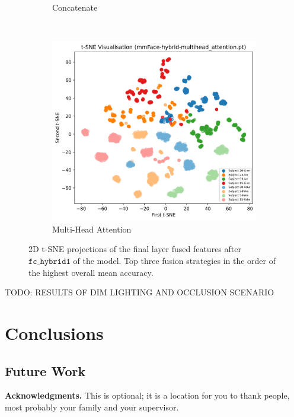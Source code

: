 \documentclass{mpaper}
\begin{document}
\begin{figure}[!htb]
\begin{subfigure}[b]{0.3\textwidth}
        \caption{Concatenate}
        \label{fig:tsne_concatenate}
    \end{subfigure}
    ~
    \begin{subfigure}[b]{0.3\textwidth}
        \includegraphics[width=\textwidth]{figures/tsne_multihead_attention.png}
        \caption{Multi-Head Attention}
        \label{fig:tsne_multihead_attention}
    \end{subfigure}
    \vspace{0.3cm}
    \caption{2D t-SNE projections of the final layer fused features after $\mathtt{fc\_hybrid1}$ of the model. Top three fusion strategies in the order of the highest overall mean accuracy.}
\end{figure}

TODO: RESULTS OF DIM LIGHTING AND OCCLUSION SCENARIO



\section{Conclusions}



\subsection{Future Work}


{\bf Acknowledgments.}
This is optional; it is a location for you to thank people, most probably your family and your supervisor.




\end{document}

